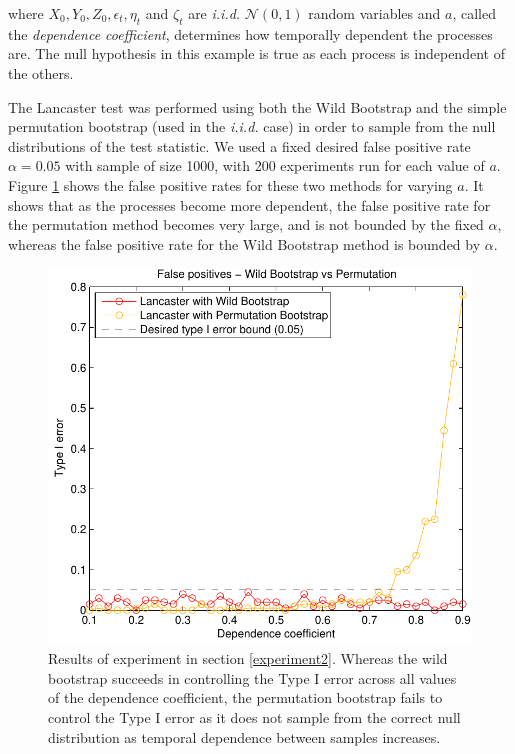 \documentclass[]{article}
\begin{document}
where $X_0, Y_0, Z_0, \epsilon_t, \eta_t$ and $\zeta_t$ are \emph{i.i.d. } $\mathcal{N}(0,1)$ random variables and $a$, called the \emph{dependence coefficient}, determines how temporally dependent the processes are. The null hypothesis in this example is true as each process is independent of the others.

The Lancaster test was performed using both the Wild Bootstrap and the simple permutation bootstrap (used in the \emph{i.i.d. } case) in order to sample from the null distributions of the test statistic. We used a fixed desired false positive rate $\alpha = 0.05$ with sample of size 1000, with 200 experiments run for each value of $a$. Figure \ref{wildBootstrap_is_necessary} shows the false positive rates for these two methods for varying $a$. It shows that as the processes become more dependent, the false positive rate for the permutation method becomes very large, and is not bounded by the fixed $\alpha$, whereas the false positive rate for the Wild Bootstrap method is bounded by $\alpha$.
\begin{figure}[ht]
\vskip 0.2in
\begin{center}
\centerline{\includegraphics[scale=0.6]{UAI_Figure2.pdf}}
\caption{Results of experiment in section \ref{experiment2}. Whereas the wild bootstrap succeeds in controlling the Type I error across all values of the dependence coefficient, the permutation bootstrap fails to control the Type I error as it does not sample from the correct null distribution as temporal dependence between samples increases.}
\label{wildBootstrap_is_necessary}
\end{center}
\vskip -0.2in
\end{figure} 
\end{document}
